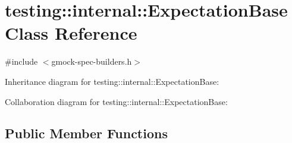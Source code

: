 \hypertarget{classtesting_1_1internal_1_1_expectation_base}{}\section{testing\+:\+:internal\+:\+:Expectation\+Base Class Reference}
\label{classtesting_1_1internal_1_1_expectation_base}


{\ttfamily \#include $<$gmock-\/spec-\/builders.\+h$>$}



Inheritance diagram for testing\+:\+:internal\+:\+:Expectation\+Base\+:


Collaboration diagram for testing\+:\+:internal\+:\+:Expectation\+Base\+:
\subsection*{Public Member Functions}
